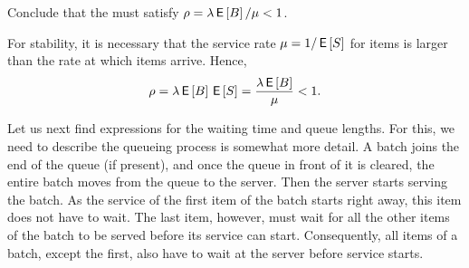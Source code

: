 \begin{exercise}
Conclude that   the  must satisfy
$\rho = \lambda \,\mathsf{E}\left[B\right]/\mu < 1$.
\begin{solution}
For stability, it is necessary that the service rate
$\mu=1/\,\mathsf{E}\left[S\right]$ for items is larger than the rate at which items
arrive.  Hence,
\begin{equation*}
\rho = \lambda \,\mathsf{E}\left[B\right] \,\mathsf{E}\left[S\right] = \frac{\lambda \,\mathsf{E}\left[B\right]} \mu < 1.
\end{equation*}
\end{solution}
\end{exercise}

Let us next find expressions for the waiting time and queue lengths. For this, we need to describe the queueing process is somewhat more detail. A batch joins the end of the queue (if present), and once the queue in front of it is cleared, the entire batch moves from the queue to the server. Then the server starts serving the batch. As the service of the first item of the batch starts right away, this item does not have to wait. The last item, however, must wait for all the other items of the batch to be served before its service can start. Consequently, all items of a batch, except the first, also have to wait at the server before service starts. 



